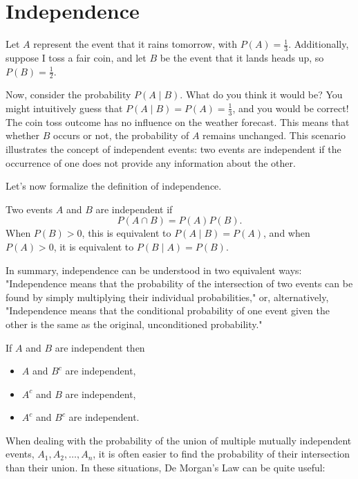 \section{Independence}
Let $A$ represent the event that it rains tomorrow, with $P(A)=\frac{1}{3}$. Additionally, suppose I toss a fair coin, and let $B$ be the event that it lands heads up, so $P(B)=\frac{1}{2}$.

Now, consider the probability $P(A \mid B)$. What do you think it would be? You might intuitively guess that $P(A \mid B)=P(A)=\frac{1}{3}$, and you would be correct! The coin toss outcome has no influence on the weather forecast. This means that whether $B$ occurs or not, the probability of $A$ remains unchanged. This scenario illustrates the concept of independent events: two events are independent if the occurrence of one does not provide any information about the other.

Let's now formalize the definition of independence.

\begin{definition}[Independence]
    Two events \( A \) and \( B \) are independent if
    \[
        P(A \cap B)=P(A)P(B).
    \]
    When \(P(B)>0\), this is equivalent to \(P(A\mid B)=P(A)\), and when \(P(A)>0\), it is equivalent to \(P(B\mid A)=P(B)\).
\end{definition}

In summary, independence can be understood in two equivalent ways: "Independence means that the probability of the intersection of two events can be found by simply multiplying their individual probabilities," or, alternatively, "Independence means that the conditional probability of one event given the other is the same as the original, unconditioned probability."

\begin{lemma}
If $A$ and $B$ are independent then
\begin{itemize}
    \item $A$ and $B^c$ are independent,
    \item $A^c$ and $B$ are independent,
    \item $A^c$ and $B^c$ are independent.
\end{itemize}
\end{lemma}

When dealing with the probability of the union of multiple mutually independent events, \( A_1, A_2, \ldots, A_n \), it is often easier to find the probability of their intersection than their union. In these situations, De Morgan's Law can be quite useful:

